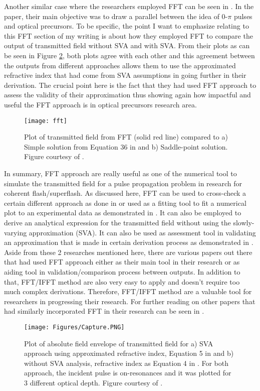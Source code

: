 Another similar case where the researchers employed FFT can be seen in \cite{Jeong2008}. In the paper, their main objective was to draw a parallel between the idea of 0-$\pi$ pulses and optical precursors. To be specific, the point I want to emphasize relating to this FFT section of my writing is about how they employed FFT to compare the output of transmitted field without SVA and with SVA. From their plots as can be seen in Figure \ref{fig: svafft}, both plots agree with each other and this agreement between the outputs from different approaches allows them to use the approximated refractive index that had come from SVA assumptions in going further in their derivation. The crucial point here is the fact that they had used FFT approach to assess the validity of their approximation thus showing again how impactful and useful the FFT approach is in optical precursors research area.

\begin{figure}[h!]
    \centering
    \texttt{[image: fft]}
    \caption{Plot of transmitted field from FFT (solid red line) compared to a) Simple solution from Equation 36 in \cite{Macke2013} and b) Saddle-point solution. Figure courtesy of \cite{Macke2013}.}
    \label{fig: fft}
\end{figure}

In summary, FFT approach are really useful as one of the numerical tool to simulate the transmitted field for a pulse propagation problem in research for coherent flash/superflash. As discussed here, FFT can be used to cross-check a certain different approach as done in \cite{Jeong2010} or used as a fitting tool to fit a numerical plot to an experimental data as demonstrated in \cite{Chen2010}. It can also be employed to derive an analytical expression for the transmitted field without using the slowly-varying approximation (SVA). It can also be used as assessment tool in validating an approximation that is made in certain derivation process as demonstrated in \cite{Jeong2008}. Aside from these 2 researches mentioned here, there are various papers out there that had used FFT approach either as their main tool in their research or as aiding tool in validation/comparison process between outputs. In addition to that, FFT/IFFT method are also very easy to apply and doesn't require too much complex derivations. Therefore, FFT/IFFT method are a valuable tool for researchers in progressing their research. For further reading on other papers that had similarly incorporated FFT in their research can be seen in \cite{Jeong2019, Jeong2010, Chen2010, Macke2015, Oughstun2010, Wei2009, MacKe2009}.

\begin{figure}[h!]
    \centering
    \texttt{[image: Figures/Capture.PNG]}
    \caption{Plot of absolute field envelope of transmitted field for a) SVA approach using approximated refractive index, Equation 5 in \cite{Jeong2008} and b) without SVA analysis, refractive index as Equation 4 in \cite{Jeong2008}. For both approach, the incident pulse is on-resonances and it was plotted for 3 different optical depth. Figure courtesy of \cite{Jeong2008}.}
    \label{fig: svafft}
\end{figure}
